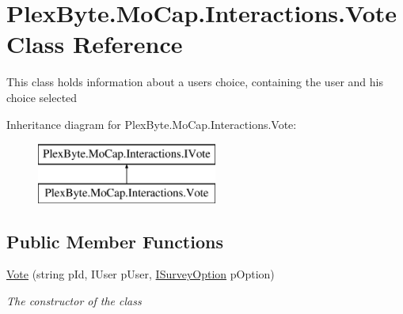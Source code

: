 \hypertarget{class_plex_byte_1_1_mo_cap_1_1_interactions_1_1_vote}{}\section{Plex\+Byte.\+Mo\+Cap.\+Interactions.\+Vote Class Reference}
\label{class_plex_byte_1_1_mo_cap_1_1_interactions_1_1_vote}


This class holds information about a users choice, containing the user and his choice selected  


Inheritance diagram for Plex\+Byte.\+Mo\+Cap.\+Interactions.\+Vote\+:\begin{figure}[H]
\begin{center}
\leavevmode
\includegraphics[height=2.000000cm]{class_plex_byte_1_1_mo_cap_1_1_interactions_1_1_vote}
\end{center}
\end{figure}
\subsection*{Public Member Functions}
\begin{DoxyCompactItemize}
\item 
\hyperlink{class_plex_byte_1_1_mo_cap_1_1_interactions_1_1_vote_a23a08f2604526ff8f6dbb330e09829f9}{Vote} (string p\+Id, I\+User p\+User, \hyperlink{interface_plex_byte_1_1_mo_cap_1_1_interactions_1_1_i_survey_option}{I\+Survey\+Option} p\+Option)
\begin{DoxyCompactList}\small\item\em The constructor of the class \end{DoxyCompactList}\end{DoxyCompactItemize}
